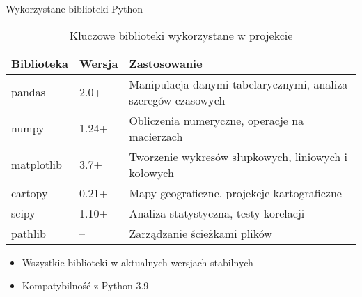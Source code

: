 \begin{frame}{Wykorzystane biblioteki Python}
    \begin{table}
        \centering
        \footnotesize
        \begin{tabular}{llp{6cm}}
            \toprule
            \textbf{Biblioteka} & \textbf{Wersja} & \textbf{Zastosowanie} \\
            \midrule
            pandas & 2.0+ & Manipulacja danymi tabelarycznymi, analiza szeregów czasowych \\
            numpy & 1.24+ & Obliczenia numeryczne, operacje na macierzach \\
            matplotlib & 3.7+ & Tworzenie wykresów słupkowych, liniowych i kołowych \\
            cartopy & 0.21+ & Mapy geograficzne, projekcje kartograficzne \\
            scipy & 1.10+ & Analiza statystyczna, testy korelacji \\
            pathlib & -- & Zarządzanie ścieżkami plików \\
            \bottomrule
        \end{tabular}
        \caption{Kluczowe biblioteki wykorzystane w projekcie}
    \end{table}
    
    \vspace{0.3cm}
    
    \begin{itemize}
        \item Wszystkie biblioteki w aktualnych wersjach stabilnych
        \item Kompatybilność z Python 3.9+
    \end{itemize}
\end{frame}

